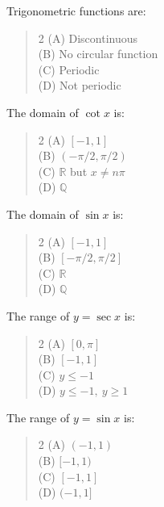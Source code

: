 \documentclass[11pt,a4paper]{article}
\begin{document}
\begin{mcqlist}
\item Trigonometric functions are:
\begin{quote}\begin{multicols}{2}
\noindent (A) Discontinuous \\
(B) No circular function \\
(C) Periodic \\
(D) Not periodic
\end{multicols}\end{quote}

\item The domain of $\cot x$ is:
\begin{quote}\begin{multicols}{2}
\noindent (A) $[-1,1]$ \\
(B) $(-\pi/2,\pi/2)$ \\
(C) $\mathbb{R}$ but $x\neq n\pi$ \\
(D) $\mathbb{Q}$
\end{multicols}\end{quote}

\item The domain of $\sin x$ is:
\begin{quote}\begin{multicols}{2}
\noindent (A) $[-1,1]$ \\
(B) $[-\pi/2,\pi/2]$ \\
(C) $\mathbb{R}$ \\
(D) $\mathbb{Q}$
\end{multicols}\end{quote}

\item The range of $y=\sec x$ is:
\begin{quote}\begin{multicols}{2}
\noindent (A) $[0,\pi]$ \\
(B) $[-1,1]$ \\
(C) $y\leq-1$ \\
(D) $y\leq-1,\ y\geq1$
\end{multicols}\end{quote}

\item The range of $y=\sin x$ is:
\begin{quote}\begin{multicols}{2}
\noindent (A) $(-1,1)$ \\
(B) $[-1,1)$ \\
(C) $[-1,1]$ \\
(D) $(-1,1]$
\end{multicols}\end{quote}


\end{mcqlist}
\end{document}
